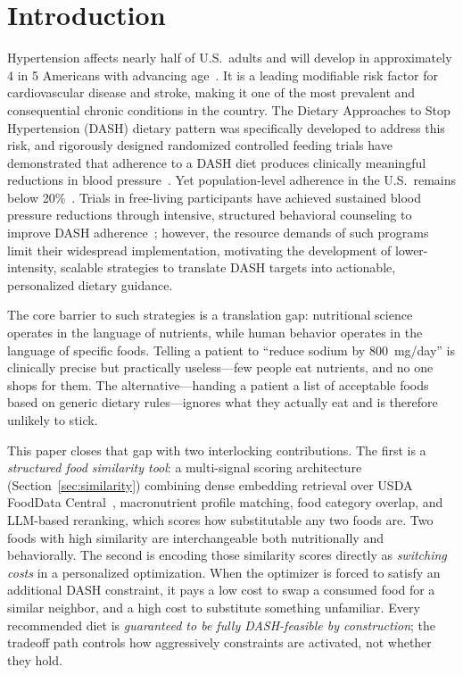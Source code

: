 \documentclass[journal]{IEEEtran}
\begin{document}
\section{Introduction}
\label{sec:intro}

Hypertension affects nearly half of U.S.\ adults and will develop in
approximately 4 in 5 Americans with advancing age~\cite{jones2025aha}.
It is a leading modifiable risk factor for cardiovascular disease and
stroke, making it one of the most prevalent and consequential chronic
conditions in the country. The Dietary Approaches to Stop Hypertension
(DASH) dietary pattern was specifically developed to address this risk,
and rigorously designed randomized controlled feeding trials have
demonstrated that adherence to a DASH diet produces clinically
meaningful reductions in blood
pressure~\cite{appel1997dash,sacks2001effects}. Yet population-level
adherence in the U.S.\ remains below
20\%~\cite{liese2009adherence}. Trials in free-living participants have
achieved sustained blood pressure reductions through intensive,
structured behavioral counseling to improve DASH
adherence~\cite{appel2003premier,blumenthal2010premier}; however,
the resource demands of such programs limit their widespread
implementation, motivating the development of lower-intensity,
scalable strategies to translate DASH targets into actionable,
personalized dietary guidance.

The core barrier to such strategies is a translation gap: nutritional
science operates in the language of nutrients, while human behavior
operates in the language of specific foods. Telling a patient to
``reduce sodium by 800~mg/day'' is clinically precise but practically
useless---few people eat nutrients, and no one shops for them. The
alternative---handing a patient a list of acceptable foods based on
generic dietary rules---ignores what they actually eat and is therefore
unlikely to stick.

This paper closes that gap with two interlocking contributions. The
first is a \emph{structured food similarity tool}: a multi-signal scoring
architecture (Section~\ref{sec:similarity}) combining dense embedding
retrieval over USDA FoodData Central~\cite{usda_2019}, macronutrient
profile matching, food category overlap, and LLM-based reranking, which
scores how substitutable any two foods are. Two foods with high
similarity are interchangeable both nutritionally and behaviorally. The
second is encoding those similarity scores directly as \emph{switching
costs} in a personalized optimization. When the optimizer is forced to
satisfy an additional DASH constraint, it pays a low cost to swap a
consumed food for a similar neighbor, and a high cost to substitute
something unfamiliar. Every recommended diet is \emph{guaranteed to be
fully DASH-feasible by construction}; the tradeoff path controls how
aggressively constraints are activated, not whether they hold.
\end{document}
